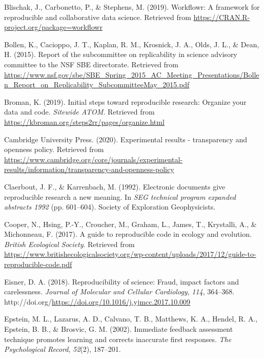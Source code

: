 \documentclass[12pt,twoside]{reedthesis}
\newenvironment{CSLReferences}%
  {}%
  {\par}
\begin{document}
\begin{CSLReferences}{1}{0}
\leavevmode\hypertarget{ref-R-workflowr}{}%
Blischak, J., Carbonetto, P., \& Stephens, M. (2019). Workflowr: A framework for reproducible and collaborative data science. Retrieved from \url{https://CRAN.R-project.org/package=workflowr}

\leavevmode\hypertarget{ref-arlington}{}%
Bollen, K., Cacioppo, J. T., Kaplan, R. M., Krosnick, J. A., Olds, J. L., \& Dean, H. (2015). Report of the subcommittee on replicability in science advisory committee to the NSF SBE directorate. Retrieved from \url{https://www.nsf.gov/sbe/SBE_Spring_2015_AC_Meeting_Presentations/Bollen_Report_on_Replicability_SubcommitteeMay_2015.pdf}

\leavevmode\hypertarget{ref-broman}{}%
Broman, K. (2019). Initial steps toward reproducible research: Organize your data and code. \emph{Sitewide ATOM}. Retrieved from \url{https://kbroman.org/steps2rr/pages/organize.html}

\leavevmode\hypertarget{ref-exp-results}{}%
Cambridge University Press. (2020). Experimental results - transparency and openness policy. Retrieved from \url{https://www.cambridge.org/core/journals/experimental-results/information/transparency-and-openness-policy}

\leavevmode\hypertarget{ref-claerbout}{}%
Claerbout, J. F., \& Karrenbach, M. (1992). Electronic documents give reproducible research a new meaning. In \emph{SEG technical program expanded abstracts 1992} (pp. 601--604). Society of Exploration Geophysicists.

\leavevmode\hypertarget{ref-cooper2017guide}{}%
Cooper, N., Hsing, P.-Y., Croucher, M., Graham, L., James, T., Krystalli, A., \& Michonneau, F. (2017). A guide to reproducible code in ecology and evolution. \emph{British Ecological Society}. Retrieved from \url{https://www.britishecologicalsociety.org/wp-content/uploads/2017/12/guide-to-reproducible-code.pdf}

\leavevmode\hypertarget{ref-eisner-reproducibility}{}%
Eisner, D. A. (2018). Reproducibility of science: Fraud, impact factors and carelessness. \emph{Journal of Molecular and Cellular Cardiology}, \emph{114}, 364--368. http://doi.org/\url{https://doi.org/10.1016/j.yjmcc.2017.10.009}

\leavevmode\hypertarget{ref-epstein2002immediate}{}%
Epstein, M. L., Lazarus, A. D., Calvano, T. B., Matthews, K. A., Hendel, R. A., Epstein, B. B., \& Brosvic, G. M. (2002). Immediate feedback assessment technique promotes learning and corrects inaccurate first responses. \emph{The Psychological Record}, \emph{52}(2), 187--201.


\end{CSLReferences}
\end{document}
